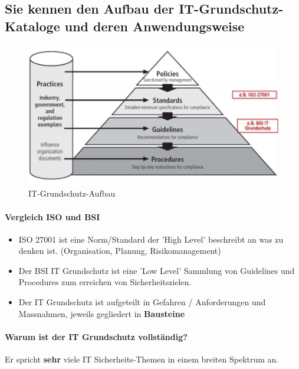 \documentclass[10pt,a4paper]{article}
\begin{document}
\subsection*{Sie kennen den Aufbau der IT-Grundschutz-Kataloge und deren Anwendungsweise}
\begin{figure}[H]
    \begin{center}
    \includegraphics[width=12cm]{images/IT-Grundschutz-Aufbau.png}
    \caption{IT-Grundschutz-Aufbau}
    \label{IT-Grundschutz-Aufbau}
    \end{center}
\end{figure}

\paragraph*{Vergleich ISO und BSI}
\begin{itemize}[noitemsep,topsep=0pt,leftmargin=*]
    \item ISO 27001 ist eine Norm/Standard der 'High Level' beschreibt an was zu denken ist. (Organisation, Planung, Risikomanagement)
    \item Der BSI IT Grundschutz ist eine 'Low Level' Sammlung von Guidelines und Procedures zum erreichen von Sicherheitszielen.
    \item Der IT Grundschutz ist aufgeteilt in Gefahren / Anforderungen und Massnahmen, jeweils gegliedert in \textbf{Bausteine}
\end{itemize}

\paragraph*{Warum ist der IT Grundschutz vollständig?}Er spricht \textbf{sehr} viele IT Sicherheits-Themen in einem breiten Spektrum an.
\end{document}
